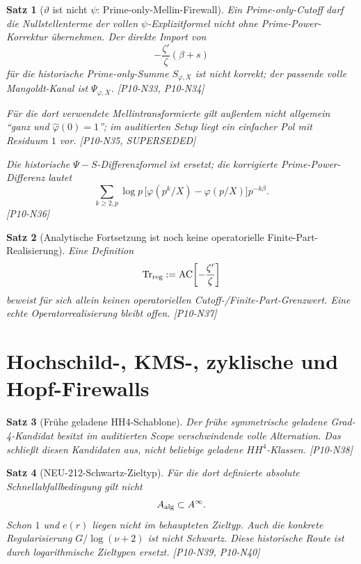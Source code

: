 \documentclass[11pt,a4paper]{amsart}
\newtheorem{theorem}{Satz}[section]
\begin{document}
\begin{theorem}[$\vartheta$ ist nicht $\psi$: Prime-only-Mellin-Firewall]
\label{thm:n33n36}
Ein Prime-only-Cutoff darf die Nullstellenterme der vollen
$\psi$-Explizitformel nicht ohne Prime-Power-Korrektur übernehmen. Der direkte
Import von
\[
  -\frac{\zeta'}{\zeta}(\beta+s)
\]
für die historische Prime-only-Summe $S_{\varphi,X}$ ist nicht korrekt; der
passende volle Mangoldt-Kanal ist $\Psi_{\varphi,X}$.
\emph{[P10-N33, P10-N34]}

Für die dort verwendete Mellintransformierte gilt außerdem nicht allgemein
``ganz und $\widehat\varphi(0)=1$''; im auditierten Setup liegt ein einfacher
Pol mit Residuum $1$ vor. \emph{[P10-N35, SUPERSEDED]}

Die historische $\Psi-S$-Differenzformel ist ersetzt; die korrigierte
Prime-Power-Differenz lautet
\[
  \sum_{k\ge2,p}\log p\,
  \bigl[\varphi(p^k/X)-\varphi(p/X)\bigr]p^{-k\beta}.
\]
\emph{[P10-N36]}
\end{theorem}

\begin{theorem}[Analytische Fortsetzung ist noch keine operatorielle
Finite-Part-Realisierung]\label{thm:n37}
Eine Definition
\[
  \operatorname{Tr}_{\rm reg}
  :=\operatorname{AC}\!\left[-\frac{\zeta'}{\zeta}\right]
\]
beweist für sich allein keinen operatoriellen Cutoff-/Finite-Part-Grenzwert.
Eine echte Operatorrealisierung bleibt offen. \emph{[P10-N37]}
\end{theorem}

\section{Hochschild-, KMS-, zyklische und Hopf-Firewalls}

\begin{theorem}[Frühe geladene HH4-Schablone]\label{thm:n38}
Der frühe symmetrische geladene Grad-4-Kandidat besitzt im auditierten Scope
verschwindende volle Alternation. Das schließt diesen Kandidaten aus, nicht
beliebige geladene $HH^4$-Klassen. \emph{[P10-N38]}
\end{theorem}

\begin{theorem}[NEU-212-Schwartz-Zieltyp]\label{thm:n39n40}
Für die dort definierte absolute Schnellabfallbedingung gilt nicht
\[
  A_{\rm alg}\subset A^\infty.
\]
Schon $1$ und $e(r)$ liegen nicht im behaupteten Zieltyp.
Auch die konkrete Regularisierung $G/\log(\nu+2)$ ist nicht Schwartz. Diese
historische Route ist durch logarithmische Zieltypen ersetzt.
\emph{[P10-N39, P10-N40]}
\end{theorem}
\end{document}
